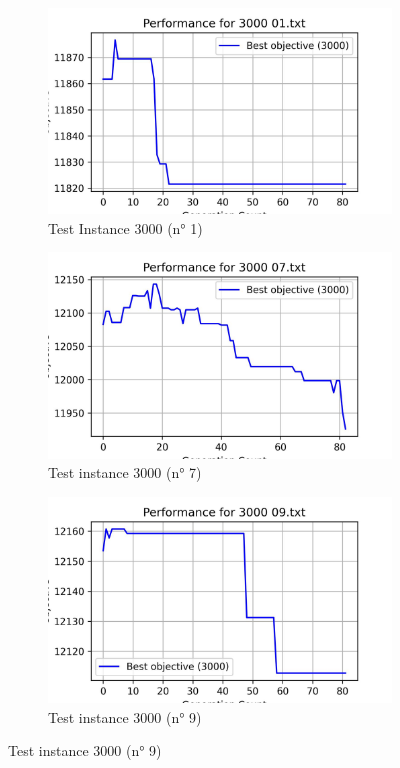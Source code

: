 \begin{figure}[h]
    \centering
    \begin{subfigure}{0.32\textwidth}
        \centering
        \includegraphics[width=\linewidth]{../results/5/plots/objective_vs_gen_3000_01.txt.jpg}
        \caption{Test Instance 3000 (n° 1)}
    \end{subfigure}
    \hfill
    \begin{subfigure}{0.32\textwidth}
        \centering
        \includegraphics[width=\linewidth]{../results/5/plots/objective_vs_gen_3000_07.txt.jpg}
        \caption{Test instance 3000 (n° 7)}
    \end{subfigure}
    \hfill
    \begin{subfigure}{0.32\textwidth}
        \centering
        \includegraphics[width=\linewidth]{../results/5/plots/objective_vs_gen_3000_09.txt.jpg}
        \caption{Test instance 3000 (n° 9)}
    \end{subfigure}


\end{figure}
